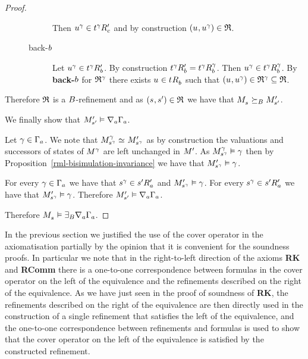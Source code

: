 \begin{proof}
\begin{description}
\begin{description}
                Then $\kStateU[\gamma] \in \kSuccessorsPC{\kStateT[\gamma]}$ and by construction $(\kStateU, \kStateU[\gamma]) \in \refinement$.
            \item [back-$\agentB$]
                Let $\kStateU[\gamma] \in \kSuccessorsPB{\kStateT[\gamma]}$.
                By construction $\kSuccessorsPB{\kStateT[\gamma]} = \kSuccessorsB[\gamma]{\kStateT[\gamma]}$.
                Then $\kStateU[\gamma] \in \kSuccessorsB[\gamma]{\kStateT[\gamma]}$.
                By {\bf back-$\agentB$} for $\refinement^\gamma$ there exists $\kStateU \in \kSuccessorsB{\kStateT}$ such that $(\kStateU, \kStateU[\gamma]) \in \refinement^\gamma \subseteq \refinement$.
        \end{description}
\end{description}

Therefore $\refinement$ is a $\agentsB$-refinement and as $(\kStateS, \kStateSP) \in \refinement$ we have that $\kPModel{\kStateS} \simulatesBs \kPModelP{\kStateSP}$.

We finally show that $\kPModelP{\kStateSP} \entails \coversA \Gamma_\agentA$.

Let $\gamma \in \Gamma_\agentA$.
We note that $\kPModel[\gamma]{\kStateS[\gamma]} \bisimilar \kPModelP{\kStateS[\gamma]}$ as by construction the valuations and successors of states of $\kModel[\gamma]$ are left unchanged in $\kModelP$.
As $\kPModel[\gamma]{\kStateS[\gamma]} \entails \gamma$ then by Proposition~\ref{rml-bisimulation-invariance} we have that $\kPModelP{\kStateS[\gamma]} \entails \gamma$.

For every $\gamma \in \Gamma_\agentA$ we have that $\kStateS[\gamma] \in \kSuccessorsPA{\kStateSP}$ and $\kPModelP{\kStateS[\gamma]} \entails \gamma$.
For every $\kStateS[\gamma] \in \kSuccessorsPA{\kStateSP}$ we have that $\kPModelP{\kStateS[\gamma]} \entails \gamma$.
Therefore $\kPModelP{\kStateSP} \entails \coversA \Gamma_\agentA$.

Therefore $\kPModel{\kStateS} \entails \somerefsBs \coversA \Gamma_\agentA$.
\end{proof}

In the previous section we justified the use of the cover operator in the axiomatisation partially by the opinion that it is convenient for the soundness proofs.
In particular we note that in the right-to-left direction of the axioms {\bf RK} and {\bf RComm} there is a one-to-one correspondence between formulas in the cover operator on the left of the equivalence and the refinements described on the right of the equivalence.
As we have just seen in the proof of soundness of {\bf RK}, the refinements described on the right of the equivalence are then directly used in the construction of a single refinement that satisfies the left of the equivalence, and the one-to-one correspondence between refinements and formulas is used to show that the cover operator on the left of the equivalence is satisfied by the constructed refinement.

